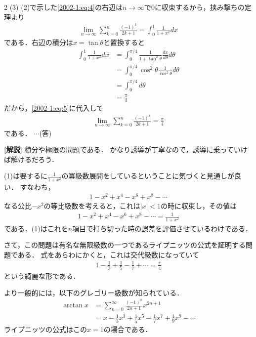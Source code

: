 \documentclass[../../main.tex]{subfiles}
\begin{document}
\begin{multicols}{2}
  \vspace{10pt}
  (3)
  (2)で示した\cref{2002-1:eq:4}の右辺は$n\to\infty$で$0$に収束するから，挟み撃ちの定理より
  \begin{align}
    \lim_{n\to\infty} \sum_{k=0}^n \frac{(-1)^k}{2k+1} = \int_0^1 \frac{1}{1+x^2} dx \label{2002-1:eq:5}
  \end{align}
  である．右辺の積分は$x=\tan\theta$と置換すると
  \begin{align*}
    \int_0^1 \frac{1}{1+x^2} dx
     & = \int_0^{\pi/4} \frac{1}{1+\tan^2\theta} \frac{dx}{d\theta} d\theta \\
     & = \int_0^{\pi/4} \cos^2\theta \frac{1}{\cos^2\theta} d\theta         \\
     & = \int_0^{\pi/4} d\theta                                             \\
     & = \frac{\pi}{4}
  \end{align*}
  だから，\cref{2002-1:eq:5}に代入して
  \begin{align*}
    \lim_{n\to\infty} \sum_{k=0}^n \frac{(-1)^k}{2k+1} = \frac{\pi}{4}
  \end{align*}
  である．  $\cdots$(答)


  \vspace{10pt}
  {\bf[解説]}
  積分や極限の問題である．
  かなり誘導が丁寧なので，誘導に乗っていけば解けるだろう．

  (1)は要するに$\frac{1}{1+x^2}$の冪級数展開をしているということに気づくと見通しが良い．
  すなわち，
  \begin{align*}
    1-x^2+x^4-x^6+x^8-\cdots
  \end{align*}
  なる公比$-x^2$の等比級数を考えると，これは$|x|<1$の時に収束し，その値は
  \begin{align*}
    1-x^2+x^4-x^6+x^8-\cdots = \frac{1}{1+x^2}
  \end{align*}
  である．(1)はこれを$n$項目で打ち切った時の誤差を評価させているわけである．


  さて，この問題は有名な無限級数の一つであるライプニッツの公式を証明する問題である．
  式をあらわにかくと，これは交代級数になっていて
  \begin{align*}
    1-\frac{1}{3}+\frac{1}{5}-\frac{1}{7}+\cdots = \frac{\pi}{4}
  \end{align*}
  という綺麗な形である．

  より一般的には，以下のグレゴリー級数が知られている．
  \begin{align*}
    \arctan x
     & = \sum_{n=0}^{\infty}\frac{(-1)^n}{2n+1}x^{2n+1}                       \\
     & = x-\frac{1}{3}x^3+\frac{1}{5}x^5-\frac{1}{7}x^7+\frac{1}{9}x^9-\cdots
  \end{align*}
  ライプニッツの公式はこの$x=1$の場合である．


\end{multicols}
\end{document}
